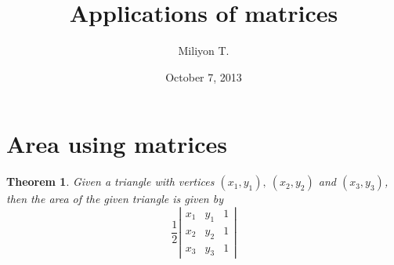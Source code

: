 \documentclass[12pt]{article}
\newtheorem{thm}{Theorem}[section]
\theoremstyle{definition}
\begin{document}
\nocite{}

\title{Applications of matrices}

\author{Miliyon T.}
\date{October 7, 2013}
\maketitle


\section{Area using matrices}
\begin{thm}
Given a triangle with vertices $(x_1,y_1),\ (x_2,y_2)$ and $(x_3,y_3)$, then the area of the given triangle is given by
\[ \frac{1}{2}\left|
    \begin{matrix}
      x_1 & y_1 & 1\\
      x_2 & y_2 & 1\\
      x_3 & y_3 & 1
    \end{matrix}
    \right|\]
\end{thm}
\end{document}
